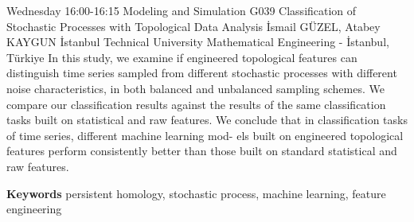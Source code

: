 
    \begin{abstract_basarim}
    {Wednesday 16:00-16:15}
    {Modeling and Simulation}
    {G039}
    {Classification of Stochastic Processes with Topological Data Analysis}
    {%
    İsmail GÜZEL, Atabey KAYGUN}
    {%
    }
    {%
    İstanbul Technical University Mathematical Engineering - İstanbul, Türkiye}
    In this study, we examine if engineered topological features can distinguish time series sampled from different stochastic processes with different noise characteristics, in both balanced and unbalanced sampling schemes. We compare our classification results against the results of the same classification tasks built on statistical and raw features. We conclude that in classification tasks of time series, different machine learning mod- els built on engineered topological features perform consistently better than those built on standard statistical and raw features. 
    
        \textbf{Keywords} \newline{}persistent homology, stochastic process, machine learning, feature engineering
    \end{abstract_basarim}
    